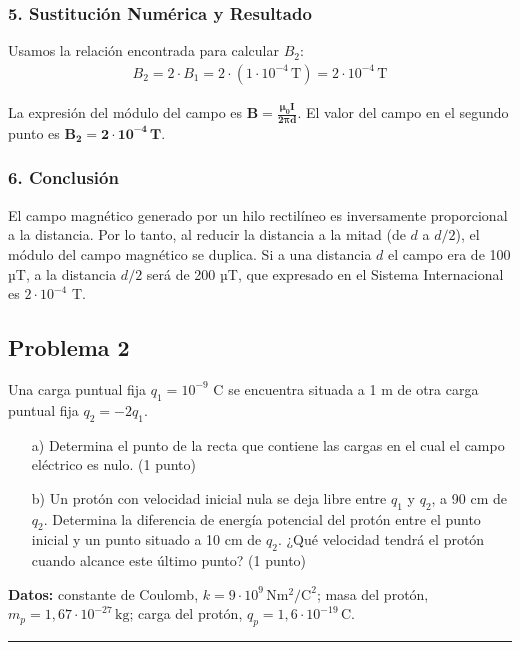 \subsubsection*{5. Sustitución Numérica y Resultado}
Usamos la relación encontrada para calcular $B_2$:
\begin{gather}
    B_2 = 2 \cdot B_1 = 2 \cdot (1 \cdot 10^{-4} \, \text{T}) = 2 \cdot 10^{-4} \, \text{T}
\end{gather}
\begin{cajaresultado}
La expresión del módulo del campo es $\boldsymbol{B = \frac{\mu_0 I}{2 \pi d}}$. El valor del campo en el segundo punto es $\boldsymbol{B_2 = 2 \cdot 10^{-4} \, T}$.
\end{cajaresultado}

\subsubsection*{6. Conclusión}
\begin{cajaconclusion}
El campo magnético generado por un hilo rectilíneo es inversamente proporcional a la distancia. Por lo tanto, al reducir la distancia a la mitad (de $d$ a $d/2$), el módulo del campo magnético se duplica. Si a una distancia $d$ el campo era de 100 µT, a la distancia $d/2$ será de 200 µT, que expresado en el Sistema Internacional es $2 \cdot 10^{-4}$ T.
\end{cajaconclusion}

\newpage

\subsection{Problema 2}
\label{subsec:P2_2022_jun_ord}

\begin{cajaenunciado}
Una carga puntual fija $q_1 = 10^{-9}$ C se encuentra situada a 1 m de otra carga puntual fija $q_2 = -2 q_1$.
\begin{enumerate}
    \item[a)] Determina el punto de la recta que contiene las cargas en el cual el campo eléctrico es nulo. (1 punto) 
    \item[b)] Un protón con velocidad inicial nula se deja libre entre $q_1$ y $q_2$, a 90 cm de $q_2$. Determina la diferencia de energía potencial del protón entre el punto inicial y un punto situado a 10 cm de $q_2$. ¿Qué velocidad tendrá el protón cuando alcance este último punto? (1 punto) 
\end{enumerate}
\textbf{Datos:} constante de Coulomb, $k=9\cdot10^{9}\,\text{N}\text{m}^2/\text{C}^2$; masa del protón, $m_p=1,67\cdot10^{-27}\,\text{kg}$; carga del protón, $q_p=1,6\cdot10^{-19}\,\text{C}$. 
\end{cajaenunciado}
\hrule

